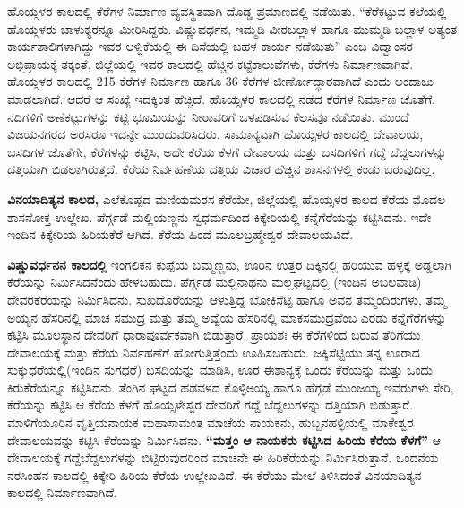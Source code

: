 ಹೊಯ್ಸಳರ ಕಾಲದಲ್ಲಿ ಕೆರೆಗಳ ನಿರ್ಮಾಣ ವ್ಯವಸ್ಥಿತವಾಗಿ ದೊಡ್ಡ ಪ್ರಮಾಣದಲ್ಲಿ ನಡೆಯಿತು. “ಕೆರೆಕಟ್ಟುವ ಕಲೆಯಲ್ಲಿ ಹೊಯ್ಸಳರು ಚಾಳುಕ್ಯರನ್ನೂ ಮೀರಿಸಿದ್ದರು. ವಿಷ್ಣುವರ್ಧನ, ಇಮ್ಮಡಿ ವೀರಬಲ್ಲಾಳ ಹಾಗೂ ಮುಮ್ಮಡಿ ಬಲ್ಲಾಳ ಅತ್ಯಂತ ಕಾರ್ಯಶಾಲಿಗಳಾಗಿದ್ದು ಇವರ ಆಳ್ವಿಕೆಯಲ್ಲಿ ಈ ದಿಸೆಯಲ್ಲಿ ಬಹಳ ಕಾರ್ಯ ನಡೆಯಿತು” ಎಂಬ ವಿದ್ವಾಂಸರ ಅಭಿಪ್ರಾಯಕ್ಕೆ ತಕ್ಕಂತೆ, ಜಿಲ್ಲೆಯಲ್ಲಿ ಇವರ ಕಾಲದಲ್ಲಿ ಹೆಚ್ಚಿನ ಕಟ್ಟೆಕಾಲುವೆಗಳು, ಕೆರೆಗಳು ನಿರ್ಮಾಣವಾಗಿವೆ. ಹೊಯ್ಸಳರ ಕಾಲದಲ್ಲಿ 215 ಕೆರೆಗಳ ನಿರ್ಮಾಣ ಹಾಗೂ 36 ಕೆರೆಗಳ ಜೀರ್ಣೋದ್ಧಾರವಾಗಿದೆ ಎಂದು ಅಂದಾಜು ಮಾಡಲಾಗಿದೆ. ಆದರೆ ಆ ಸಂಖ್ಯೆ ಇದಕ್ಕಿಂತ ಹೆಚ್ಚಿದೆ. ಹೊಯ್ಸಳರ ಕಾಲದಲ್ಲಿ ನಡೆದ ಕೆರೆಗಳ ನಿರ್ಮಾಣ ಜೊತೆಗೆ, ನದಿಗಳಿಗೆ ಅಣೆಕಟ್ಟುಗಳನ್ನು ಕಟ್ಟಿ ಭೂಮಿಯನ್ನು ನೀರಾವರಿಗೆ ಒಳಪಡಿಸುವ ಕೆಲಸವೂ ನಡೆಯಿತು. ಮುಂದೆ ವಿಜಯನಗರದ ಅರಸರೂ ಇದನ್ನೇ ಮುಂದುವರಿಸಿದರು. ಸಾಮಾನ್ಯವಾಗಿ ಹೊಯ್ಸಳರ ಕಾಲದಲ್ಲಿ ದೇವಾಲಯ, ಬಸದಿಗಳ ಜೊತೆಗೇ, ಕೆರೆಗಳನ್ನು ಕಟ್ಟಿಸಿ, ಅದೇ ಕೆರೆಯ ಕೆಳಗೆ ದೇವಾಲಯ ಮತ್ತು ಬಸದಿಗಳಿಗೆ ಗದ್ದೆ ಬೆದ್ದಲುಗಳನ್ನು ದತ್ತಿಯಾಗಿ ಬಿಡಲಾಗಿರುತ್ತದೆ. ಕೆರೆಯ ನಿರ್ವಹಣೆಯ ದತ್ತಿಯ ವಿಚಾರ ಹೆಚ್ಚಿನ ಶಾಸನಗಳಲ್ಲಿ ಕಂಡು ಬರುವುದಿಲ್ಲ.

\textbf{ವಿನಯಾದಿತ್ಯನ ಕಾಲದ,} ಎಲೆಕೊಪ್ಪದ ಮಣಿಯಮರಸ ಕೆರೆಯೇ, ಜಿಲ್ಲೆಯಲ್ಲಿ ಹೊಯ್ಸಳರ ಕಾಲದ ಕೆರೆಯ ಮೊದಲ ಶಾಸನೋಕ್ತ ಉಲ್ಲೇಖ. ಪೆರ್ಗ್ಗಡೆ ಮಲ್ಲಿಯಣ್ಣನು ಸ್ವಧರ್ಮದಿಂದ ಕಿಕ್ಕೇರಿಯಲ್ಲಿ ಕನ್ನೆಗೆರೆಯನ್ನು ಕಟ್ಟಿಸಿದನು. ಇದೇ ಇಂದಿನ ಕಿಕ್ಕೇರಿಯ ಹಿರಿಯಕೆರೆ ಆಗಿದೆ. ಕೆರೆಯ ಹಿಂದೆ ಮೂಲಬ್ರಹ್ಮೇಶ್ವರ ದೇವಾಲಯವಿದೆ.

\textbf{ವಿಷ್ಣುವರ್ಧನನ ಕಾಲದಲ್ಲಿ} ಇಂಗಲಿಕನ ಕುಪ್ಪೆಯ ಬಮ್ಮಣ್ಣನು, ಊರಿನ ಉತ್ತರ ದಿಕ್ಕಿನಲ್ಲಿ ಹರಿಯುವ ಹಳ್ಳಕ್ಕೆ ಅಡ್ಡಲಾಗಿ ಕೆರೆಯನ್ನು ನಿರ್ಮಿಸಿದನೆಂದು ಹೇಳಬಹುದು. ಪೆರ್ಗ್ಗಡೆ ಮಲ್ಲಿನಾಥನು ಮಲ್ಲಘಟ್ಟದಲ್ಲಿ (ಇಂದಿನ ಅಬಲವಾಡಿ) ದೇವರಕೆರೆಯನ್ನು ನಿರ್ಮಿಸಿದನು. ಸುಖದೊರೆಯನ್ನು ಆಳುತ್ತಿದ್ದ ಬೋಕಿಸೆಟ್ಟಿ ಹಾಗೂ ಅವನ ತಮ್ಮಂದಿರುಗಳು, ತಮ್ಮ ಅಯ್ಯನ ಹೆಸರಿನಲ್ಲಿ ಮಾಚ ಸಮುದ್ರ ಮತ್ತು ತಮ್ಮ ಅವ್ವೆಯ ಹೆಸರಿನಲ್ಲಿ ಮಾಕಸಮುದ್ರವೆಂಬ ಎರಡು ಕನ್ನೆಗೆರೆಗಳನ್ನು ಕಟ್ಟಿಸಿ ಮೂಲಸ್ಥಾನ ದೇವರಿಗೆ ಧಾರಾಪೂರ್ವಕವಾಗಿ ಬಿಡುತ್ತಾರೆ. ಪ್ರಾಯಶಃ ಈ ಕೆರೆಗಳಿಂದ ಬರುವ ತೆರಿಗೆಯು ದೇವಾಲಯಕ್ಕೆ ಮತ್ತು ಕೆರೆಯ ನಿರ್ವಹಣೆಗೆ ಹೋಗುತ್ತಿತ್ತೆಂದು ಊಹಿಸಬಹುದು. ಜಕ್ಕಿಸೆಟ್ಟಿಯು ತನ್ನ ಊರಾದ ಸುಕ್ಕುಧರೆಯಲ್ಲಿ(ಇಂದಿನ ಸುಗಧರೆ) ಬಸದಿಯನ್ನು ಮಾಡಿಸಿ, ಊರ ಈಶಾನ್ಯಕ್ಕೆ ಒಂದು ಕೆರೆಯನ್ನು ಮತ್ತು ಒಂದು ಕಿರುಕೆರೆಯನ್ನೂ ಕಟ್ಟಿಸಿದನು. ತೆಂಗಿನ ಘಟ್ಟದ ಹಡವಳದ ಕೊಳ್ಳಿಅಯ್ಯ ಹಾಗೂ ಹೆಗ್ಗಡೆ ಮುಂಜಯ್ಯ ಇವರುಗಳು ಸೇರಿ, ಕೆರೆಯನ್ನು ಕಟ್ಟಿಸಿ ಆ ಕೆರೆಯ ಕೆಳಗೆ ಹೊಯ್ಸಳೇಸ್ವರ ದೇವರಿಗೆ ಗದ್ದೆ ಬೆದ್ದಲುಗಳನ್ನು ದತ್ತಿಯಾಗಿ ಬಿಡುತ್ತಾರೆ. ಮಾಳಿಗೆಯೂರಿನ ವೃತ್ತಿಯನಾಯಕ ಮಹಾಸಾಮಂತ ಮಾಚೆಯ ನಾಯಕನು, ಹುಬ್ಬನಹಳ್ಳಿಯಲ್ಲಿ ಮಾಕೇಶ್ವರ ದೇವಾಲಯವನ್ನು ಕಟ್ಟಿಸಿ ಕೆರೆಯನ್ನು ನಿರ್ಮಿಸಿದನು. \textbf{“ಮತ್ತಂ ಆ ನಾಯಕರು ಕಟ್ಟಿಸಿದ ಹಿರಿಯ ಕೆರೆಯ ಕೆಳಗೆ”} ಆ ದೇವಾಲಯಕ್ಕೆ ಗದ್ದೆಬೆದ್ದಲುಗಳನ್ನು ಬಿಟ್ಟಿರುವುದರಿಂದ ಮಾಚನೇ ಈ ಹಿರಿಕೆರೆಯನ್ನು ನಿರ್ಮಿಸಿರುತ್ತಾನೆ. ಒಂದನೆಯ ನರಸಿಂಹನ ಕಾಲದಲ್ಲಿ ಕಿಕ್ಕೇರಿ ಹಿರಿಯ ಕೆರೆಯ ಉಲ್ಲೇಖವಿದೆ. ಈ ಕೆರೆಯು ಮೇಲೆ ತಿಳಿಸಿದಂತೆ ವಿನಯಾದಿತ್ಯನ ಕಾಲದಲ್ಲಿ ನಿರ್ಮಾಣವಾಗಿದೆ.

